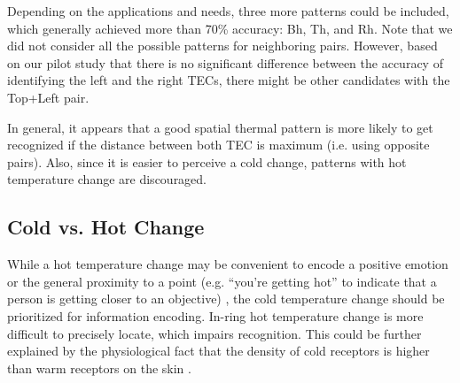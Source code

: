 \documentclass[preprint,12pt]{elsarticle}
\begin{document}
Depending on the applications and needs, three more patterns could be included, which generally achieved more than 70\% accuracy: Bh, Th, and Rh. Note that we did not consider all the possible patterns for neighboring pairs. However, based on our pilot study that there is no significant difference between the accuracy of identifying the left and the right TECs, there might be other candidates with the Top+Left pair.

In general, it appears that a good spatial thermal pattern is more likely to get recognized if the distance between both TEC is maximum (i.e. using opposite pairs). Also, since it is easier to perceive a cold change, patterns with hot temperature change are discouraged.

\subsection{Cold vs. Hot Change}
While a hot temperature change may be convenient to encode a positive emotion \cite{41} or the general proximity to a point (e.g. ``you're getting hot'' to indicate that a person is getting closer to an objective) \cite{34}, the cold temperature change should be prioritized for information encoding. In-ring hot temperature change is more difficult to precisely locate, which impairs recognition. This could be further explained by the physiological fact that the density of  cold receptors is higher than warm receptors on the skin \cite{15}.
\end{document}
